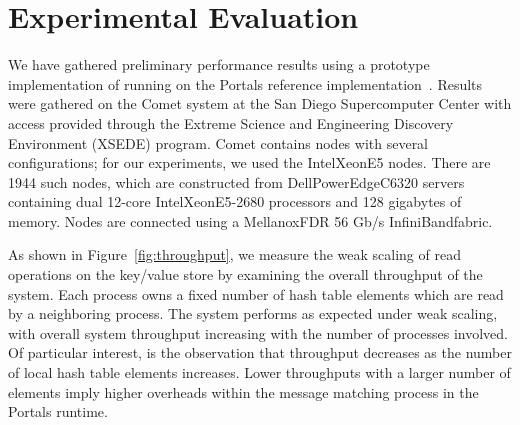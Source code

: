 \section{Experimental Evaluation}
\label{sec:results}

\vspace{-1mm}
We have gathered preliminary performance results using a prototype
implementation of \pdht running on the Portals reference
implementation~\cite{portals-code}.  Results were gathered on the Comet
system at the San Diego Supercomputer Center with access provided
through the Extreme Science and Engineering Discovery Environment (XSEDE)
program.  Comet contains nodes with several configurations; for our
experiments, we used the Intel\regtm Xeon\regtm E5 nodes.  There are 1944 such
nodes, which are constructed from Dell\othertm PowerEdge\othertm C6320 servers
containing dual 12-core Intel\regtm Xeon\regtm E5-2680 processors and 128
gigabytes of memory.  Nodes are connected using a Mellanox\othertm FDR 56 Gb/s
InfiniBand\othertm fabric.




As shown in Figure~\ref{fig:throughput}, we measure the weak scaling
of \pdht read operations on the key/value store by examining the
overall throughput of the system. Each process owns a fixed number of
hash table elements which are read by a neighboring process. The
system performs as expected under weak scaling, with overall system
throughput increasing with the number of processes involved. Of
particular interest, is the observation that throughput decreases as
the number of local hash table elements increases. Lower throughputs
with a larger number of elements imply higher overheads
within the message matching process in the Portals runtime.

